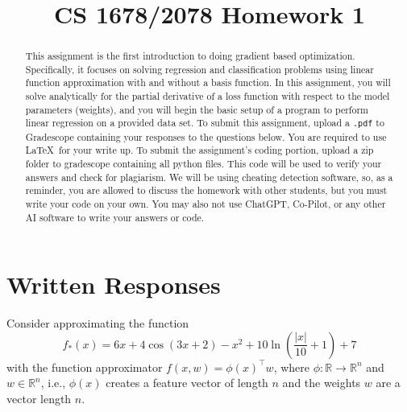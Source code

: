 \documentclass{article}
\title{CS 1678/2078 Homework 1}
\date{}
\author{}
\begin{document}
\maketitle

\begin{abstract}
    This assignment is the first introduction to doing gradient based optimization. Specifically, it focuses on solving regression and classification problems using linear function approximation with and without a basis function. In this assignment, you will solve analytically for the partial derivative of a loss function with respect to the model parameters (weights), and you will begin the basic setup of a program to perform linear regression on a provided data set. 
    To submit this assignment, upload a \texttt{.pdf} to Gradescope containing your responses to the questions below. You are required to use \LaTeX~for your write up. To submit the assignment's coding portion, upload a zip folder to gradescope containing all python files. This code will be used to verify your answers and check for plagiarism. We will be using cheating detection software, so, as a reminder, you are allowed to discuss the homework with other students, but you must write your code on your own. You may also not use ChatGPT, Co-Pilot, or any other AI software to write your answers or code. 
\end{abstract}

\section{Written Responses}
Consider approximating the function 
\begin{equation}
    f_*(x) = 6x + 4 \cos(3x + 2) - x^2 + 10 \ln \left( \frac{|x|}{10} + 1\right) + 7
\end{equation}
with the function approximator $ f(x,w) = \phi(x)^\top w$, where $\phi \colon \mathbb{R} \to \mathbb{R}^n$ and $w \in \mathbb{R}^n$, i.e., $\phi(x)$ creates a feature vector of length $n$ and the weights $w$ are a vector length $n$. 
\end{document}
